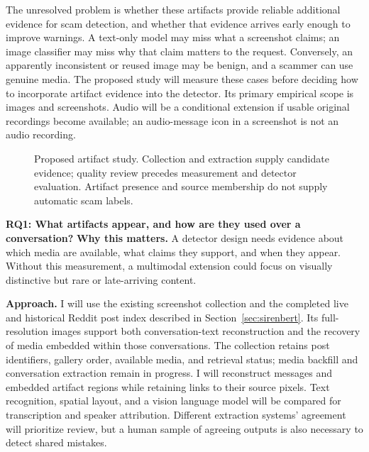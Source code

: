 \documentclass[letterpaper,11pt]{article}
\newcommand{\researchquestion}[1]{\par\medskip\noindent\textbf{#1}\quad}
\begin{document}
The unresolved problem is whether these artifacts provide reliable additional
evidence for scam detection, and whether that evidence arrives early enough to
improve warnings. A text-only model may miss what a screenshot claims; an image
classifier may miss why that claim matters to the request. Conversely, an
apparently inconsistent or reused image may be benign, and a scammer can use
genuine media. The proposed study will measure these cases before deciding how
to incorporate artifact evidence into the detector. Its primary empirical scope
is images and screenshots. Audio will be a conditional extension if usable
original recordings become available; an audio-message icon in a screenshot is
not an audio recording.

\begin{figure}[htbp]
\centering\resizebox{\linewidth}{!}{}
\caption{Proposed artifact study. Collection and extraction supply candidate
evidence; quality review precedes measurement and detector evaluation. Artifact
presence and source membership do not supply automatic scam labels.}
\label{fig:artifacts}
\end{figure}

\researchquestion{RQ1: What artifacts appear, and how are they used over a conversation?}
\textbf{Why this matters.} A detector design needs evidence about which media
are available, what claims they support, and when they appear. Without this
measurement, a multimodal extension could focus on visually distinctive but
rare or late-arriving content.

\textbf{Approach.} I will use the existing screenshot collection and the completed
live and historical Reddit post index described in Section~\ref{sec:sirenbert}.
Its full-resolution images support both conversation-text reconstruction and the
recovery of media embedded within those conversations. The collection retains
post identifiers, gallery order, available media, and retrieval status; media
backfill and conversation extraction remain in progress.
I will reconstruct messages and embedded artifact regions while retaining
links to their source pixels. Text recognition, spatial layout, and a vision
language model will be compared for transcription and speaker attribution.
Different extraction systems' agreement will prioritize review, but a human
sample of agreeing outputs is also necessary to detect shared mistakes.
\end{document}
